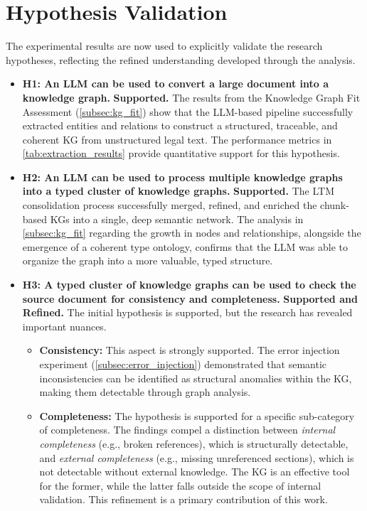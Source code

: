 \section{Hypothesis Validation}
\label{sec:hypothesis_validation}
The experimental results are now used to explicitly validate the research hypotheses, reflecting the refined understanding developed through the analysis.

\begin{itemize}
    \item \textbf{H1: An LLM can be used to convert a large document into a knowledge graph.}
    \textbf{Supported.} The results from the Knowledge Graph Fit Assessment (\cref{subsec:kg_fit}) show that the LLM-based pipeline successfully extracted entities and relations to construct a structured, traceable, and coherent KG from unstructured legal text. The performance metrics in \cref{tab:extraction_results} provide quantitative support for this hypothesis.

    \item \textbf{H2: An LLM can be used to process multiple knowledge graphs into a typed cluster of knowledge graphs.}
    \textbf{Supported.} The LTM consolidation process successfully merged, refined, and enriched the chunk-based KGs into a single, deep semantic network. The analysis in \cref{subsec:kg_fit} regarding the growth in nodes and relationships, alongside the emergence of a coherent type ontology, confirms that the LLM was able to organize the graph into a more valuable, typed structure.

    \item \textbf{H3: A typed cluster of knowledge graphs can be used to check the source document for consistency and completeness.}
    \textbf{Supported and Refined.} The initial hypothesis is supported, but the research has revealed important nuances.
    \begin{itemize}
        \item \textbf{Consistency:} This aspect is strongly supported. The error injection experiment (\cref{subsec:error_injection}) demonstrated that semantic inconsistencies can be identified as structural anomalies within the KG, making them detectable through graph analysis.
        \item \textbf{Completeness:} The hypothesis is supported for a specific sub-category of completeness. The findings compel a distinction between \textit{internal completeness} (e.g., broken references), which is structurally detectable, and \textit{external completeness} (e.g., missing unreferenced sections), which is not detectable without external knowledge. The KG is an effective tool for the former, while the latter falls outside the scope of internal validation. This refinement is a primary contribution of this work.
    \end{itemize}
\end{itemize}

